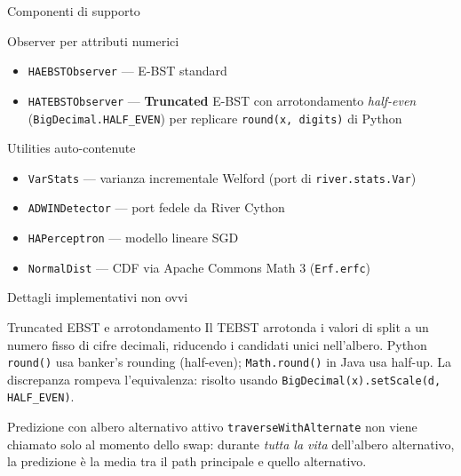 \documentclass[aspectratio=169,10pt]{beamer}
\begin{document}
\begin{frame}{Componenti di supporto}

\begin{block}{Observer per attributi numerici}
\begin{itemize}\small
  \item \texttt{HAEBSTObserver} — E-BST standard

  \item \texttt{HATEBSTObserver} — \textbf{Truncated} E-BST con arrotondamento
        \emph{half-even} (\texttt{BigDecimal.HALF\_EVEN}) per replicare
        \texttt{round(x, digits)} di Python
\end{itemize}
\end{block}

\vspace{0.2cm}

\begin{block}{Utilities auto-contenute}
\begin{itemize}\small
  \item \texttt{VarStats} — varianza incrementale Welford (port di
        \texttt{river.stats.Var})

  \item \texttt{ADWINDetector} — port fedele da River Cython

  \item \texttt{HAPerceptron} — modello lineare SGD

  \item \texttt{NormalDist} — CDF via Apache Commons Math 3
        (\texttt{Erf.erfc})
\end{itemize}
\end{block}

\vspace{0.2cm}

\end{frame}

\begin{frame}{Dettagli implementativi non ovvi}
  \begin{block}{Truncated EBST e arrotondamento}
    \small
    Il TEBST arrotonda i valori di split a un numero fisso di cifre
    decimali, riducendo i candidati unici nell'albero.
    Python \texttt{round()} usa banker's rounding (half-even);
    \texttt{Math.round()} in Java usa half-up.
    La discrepanza rompeva l'equivalenza: risolto usando
    \texttt{BigDecimal(x).setScale(d, HALF\_EVEN)}.
  \end{block}

  \medskip

  \begin{block}{Predizione con albero alternativo attivo}
    \small
    \texttt{traverseWithAlternate} non viene chiamato solo al momento
    dello swap: durante \emph{tutta la vita} dell'albero alternativo,
    la predizione è la media tra il path principale e quello alternativo.
  \end{block}
\end{frame}
\end{document}
